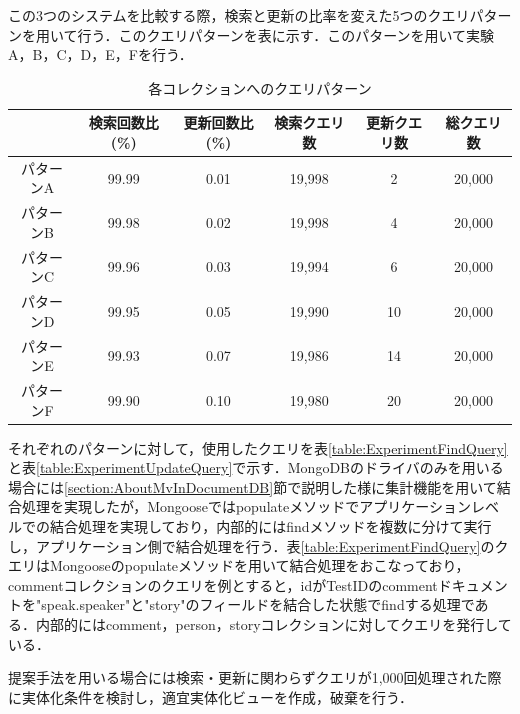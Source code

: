 \documentclass[a4paper,11pt]{ujreport}
\begin{document}
この3つのシステムを比較する際，検索と更新の比率を変えた5つのクエリパターンを用いて行う．このクエリパターンを表に示す．このパターンを用いて実験A，B，C，D，E，Fを行う．
\begin{table}[htb]
  \begin{center}
    \caption{各コレクションへのクエリパターン}
		\label{table:experiment_query_pattern}
    \begin{tabular}{|c|c|c|c|c|c|} \hline
        & 検索回数比(\%) & 更新回数比(\%) & 検索クエリ数 & 更新クエリ数 & 総クエリ数\\ \hline
      パターンA & 99.99 & 0.01 & 19,998 & 2 & 20,000 \\ \hline
      パターンB & 99.98 & 0.02 & 19,998 & 4 & 20,000 \\ \hline
      パターンC & 99.96 & 0.03 & 19,994 & 6 & 20,000 \\ \hline
			パターンD & 99.95 & 0.05 & 19,990 & 10 & 20,000 \\ \hline
      パターンE & 99.93 & 0.07 & 19,986 & 14 & 20,000 \\ \hline
      パターンF & 99.90 & 0.10 & 19,980 & 20 & 20,000 \\ \hline
    \end{tabular}
  \end{center}
\end{table}
それぞれのパターンに対して，使用したクエリを表\ref{table:ExperimentFindQuery}と表\ref{table:ExperimentUpdateQuery}で示す．MongoDBのドライバのみを用いる場合には\ref{section:AboutMvInDocumentDB}節で説明した様に集計機能を用いて結合処理を実現したが，Mongooseではpopulateメソッドでアプリケーションレベルでの結合処理を実現しており，内部的にはfindメソッドを複数に分けて実行し，アプリケーション側で結合処理を行う．表\ref{table:ExperimentFindQuery}のクエリはMongooseのpopulateメソッドを用いて結合処理をおこなっており，commentコレクションのクエリを例とすると，idがTestIDのcommentドキュメントを"speak.speaker"と"story"のフィールドを結合した状態でfindする処理である．内部的にはcomment，person，storyコレクションに対してクエリを発行している．

提案手法を用いる場合には検索・更新に関わらずクエリが1,000回処理された際に実体化条件を検討し，適宜実体化ビューを作成，破棄を行う．
\end{document}
